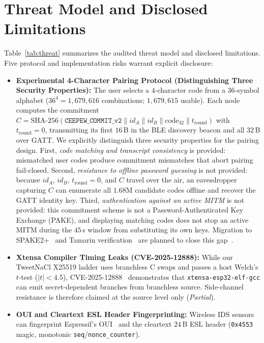 \documentclass[conference]{IEEEtran}
\begin{document}
\section{Threat Model and Disclosed Limitations}
Table~\ref{tab:threat} summarizes the audited threat model and disclosed limitations. Five protocol and implementation risks warrant explicit disclosure:
\begin{itemize}
\setlength{\itemsep}{0pt}\setlength{\parskip}{0pt}
\item \textbf{Experimental 4-Character Pairing Protocol (Distinguishing Three Security Properties):} The user selects a $4$-character code from a $36$-symbol alphabet ($36^4 = 1{,}679{,}616$ combinations; $1{,}679{,}615$ usable). Each node computes the commitment $C = \text{SHA-256}(\texttt{CEEPEW\_COMMIT\_v2} \parallel \mathit{id}_A \parallel \mathit{id}_B \parallel \text{code}_{32} \parallel t_{\mathrm{round}})$ with $t_{\mathrm{round}}=0$, transmitting its first $16$\,B in the BLE discovery beacon and all $32$\,B over GATT. We explicitly distinguish three security properties for the pairing design. First, \emph{code matching and transcript consistency} is provided: mismatched user codes produce commitment mismatches that abort pairing fail-closed. Second, \emph{resistance to offline password guessing} is not provided: because $\mathit{id}_A$, $\mathit{id}_B$, $t_{\mathrm{round}}=0$, and $C$ travel over the air, an eavesdropper capturing $C$ can enumerate all $1.68\text{M}$ candidate codes offline and recover the GATT identity key. Third, \emph{authentication against an active MITM} is not provided: this commitment scheme is not a Password-Authenticated Key Exchange (PAKE), and displaying matching codes does not stop an active MITM during the $45$\,s window from substituting its own keys. Migration to SPAKE2+~\cite{rfc9383} and Tamarin verification~\cite{vanderlinden2023} are planned to close this gap~\cite{vontschirschnitz2021,jangid2023}.
\item \textbf{Xtensa Compiler Timing Leaks (CVE-2025-12888):} While our TweetNaCl X25519 ladder uses branchless C swaps and passes a host Welch's $t$-test ($|t|<4.5$), CVE-2025-12888~\cite{cve2025_12888} demonstrates that \texttt{xtensa-esp32-elf-gcc} can emit secret-dependent branches from branchless source. Side-channel resistance is therefore claimed at the source level only (\textit{Partial}).
\item \textbf{OUI and Cleartext ESL Header Fingerprinting:} Wireless IDS sensors can fingerprint Espressif's OUI~\cite{guardianair2024} and the cleartext $24$\,B ESL header (\texttt{0x4553} magic, monotonic \texttt{seq}/\texttt{nonce\_counter}).

\end{itemize}
\end{document}
